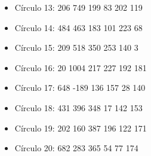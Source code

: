 \documentclass[12pt, letterpaper]{article}
\begin{document}
\begin{flushleft}
\begin{enumerate}
\begin{itemize}
\begin{itemize}
\begin{itemize}
                        \item Círculo 13: 206 749 199 83 202 119
                        \item Círculo 14: 484 463 183 101 223 68
                        \item Círculo 15: 209 518 350 253 140 3
                        \item Círculo 16: 20 1004 217 227 192 181
                        \item Círculo 17: 648 -189 136 157 28 140
                        \item Círculo 18: 431 396 348 17 142 153
                        \item Círculo 19: 202 160 387 196 122 171
                        \item Círculo 20: 682 283 365 54 77 174
                    \end{itemize}
                \end{itemize}
            \end{itemize}


\end{enumerate}
\end{flushleft}
\end{document}
